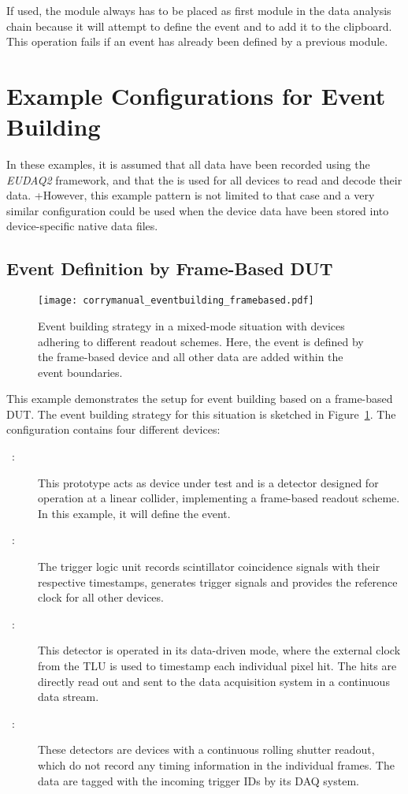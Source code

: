 If used, the  module always has to be placed as first module in the data analysis chain because it will attempt to define the event and to add it to the clipboard.
This operation fails if an event has already been defined by a previous module.


\section{Example Configurations for Event Building}

In these examples, it is assumed that all data have been recorded using the \emph{EUDAQ2} framework, and that the  is used for all devices to read and decode their data.
+However, this example pattern is not limited to that case and a very similar configuration could be used when the device data have been stored into device-specific native data files.

\subsection{Event Definition by Frame-Based DUT}
\label{sec:reco_mixedmode}
\begin{figure}[tbp]
        \centering
        \texttt{[image: corrymanual\_eventbuilding\_framebased.pdf]}
        \caption{Event building strategy in a mixed-mode situation with devices adhering to different readout schemes. Here, the event is defined by the frame-based device and all other data are added within the event boundaries.}
        \label{fig:datadrivenandframebased}
\end{figure}

This example demonstrates the setup for event building based on a frame-based DUT.
The event building strategy for this situation is sketched in Figure~\ref{fig:datadrivenandframebased}.
The configuration contains four different devices:
\begin{description}
        \item[~\cite{clicpix2}:] This prototype acts as device under test and is a detector designed for operation at a linear collider, implementing a frame-based readout scheme. In this example, it will define the event.
        \item[~\cite{aida-tlu}:] The trigger logic unit records scintillator coincidence signals with their respective timestamps, generates trigger signals and provides the reference clock for all other devices.
        \item[~\cite{timepix3}:] This detector is operated in its data-driven mode, where the external clock from the TLU is used to timestamp each individual pixel hit. The hits are directly read out and sent to the data acquisition system in a continuous data stream.
        \item[~\cite{mimosa26}:] These detectors are devices with a continuous rolling shutter readout, which do not record any timing information in the individual frames. The data are tagged with the incoming trigger IDs by its DAQ system.
\end{description}

